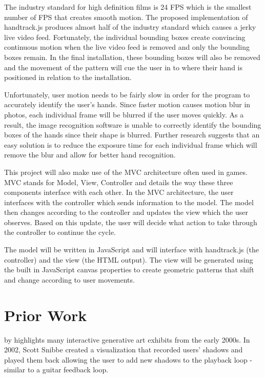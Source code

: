 \documentclass[10pt,twocolumn]{article}
\begin{document}
The industry standard for high definition films is 24 FPS \cite{noauthor_3_nodate} which is the smallest number of FPS that creates smooth motion.  The proposed implementation of handtrack.js produces almost half of the industry standard which causes a jerky live video feed.  Fortunately, the individual bounding boxes create convincing continuous motion when the live video feed is removed and only the bounding boxes remain. In the final installation, these bounding boxes will also be removed and the movement of the pattern will cue the user in to where their hand is positioned in relation to the installation.  

Unfortunately, user motion needs to be fairly slow in order for the program to accurately identify the user's hands.  Since faster motion causes motion blur in photos, each individual frame will be blurred if the user moves quickly. As a result, the image recognition software is unable to correctly identify the bounding boxes of the hands since their shape is blurred. Further research suggests that an easy solution is to reduce the exposure time for each individual frame which will remove the blur \cite{e_adjusting_2019} and allow for better hand recognition.   

This project will also make use of the MVC architecture often used in games.  MVC stands for Model, View, Controller and details the way these three components interface with each other. In the MVC architecture, the user interfaces with the controller which sends information to the model.  The model then changes according to the controller and updates the view which the user observes.  Based on this update, the user will decide what action to take through the controller to continue the cycle. 

The model will be written in JavaScript and will interface with handtrack.js (the controller) and the view (the HTML output).  The view will be generated using the built in JavaScript canvas properties to create geometric patterns that shift and change according to user movements. 

\section{Prior Work}

 by \citeauthor{kwon_real-time_nodate} highlights many interactive generative art exhibits from the early 2000s. In 2002, Scott Snibbe created a visualization that recorded users' shadows and played them back allowing the user to add new shadows to the playback loop - similar to a guitar feedback loop. 
\end{document}
